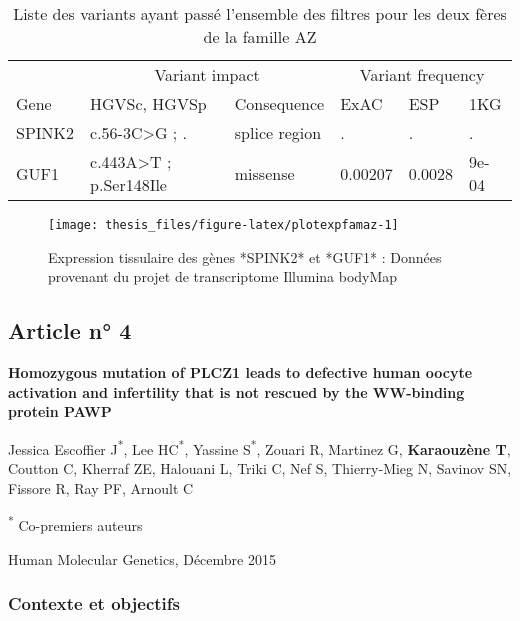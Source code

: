 \documentclass[12pt,twoside]{reedthesis}
\theoremstyle{definition}
\theoremstyle{definition}
\theoremstyle{remark}
\begin{document}
  \begin{longtable}[t]{llllll}
  \caption{\label{tab:tabrecapaz}Liste des variants ayant passé l'ensemble des filtres pour les deux fères de la famille AZ}\\
  \toprule
  \multicolumn{1}{c}{ } & \multicolumn{2}{c}{Variant impact} & \multicolumn{3}{c}{Variant frequency} \\
  \cmidrule(l{2pt}r{2pt}){2-3} \cmidrule(l{2pt}r{2pt}){4-6}
  Gene & HGVSc, HGVSp & Consequence & ExAC & ESP & 1KG\\
  \midrule
  SPINK2 & c.56-3C>G ; . & splice region & . & . & .\\
  GUF1 & c.443A>T ; p.Ser148Ile & missense & 0.00207 & 0.0028 & 9e-04\\
  \bottomrule
  \end{longtable}
  
  \newpage
  
  \begin{figure}
  
  {\centering \texttt{[image: thesis\_files/figure-latex/plotexpfamaz-1]} 
  
  }
  
  \caption[Expression tissulaire des gènes *SPINK2* et *GUF1*]{Expression tissulaire des gènes *SPINK2* et *GUF1* : Données provenant du projet de transcriptome Illumina bodyMap}\label{fig:plotexpfamaz}
  \end{figure}
  
  \newpage
  
  \subsection{Article n° 4}\label{article-n-4}
  
  \textbf{Homozygous mutation of PLCZ1 leads to defective human oocyte
  activation and infertility that is not rescued by the WW-binding protein
  PAWP}
  
  Jessica Escoffier J\textsuperscript{*}, Lee HC\textsuperscript{*},
  Yassine S\textsuperscript{*}, Zouari R, Martinez G, \textbf{Karaouzène
  T}, Coutton C, Kherraf ZE, Halouani L, Triki C, Nef S, Thierry-Mieg N,
  Savinov SN, Fissore R, Ray PF, Arnoult C
  
  \textsuperscript{*} Co-premiers auteurs
  
  Human Molecular Genetics, Décembre 2015
  
  \newpage
  
  \subsubsection{Contexte et objectifs}\label{contexte-et-objectifs-1}
  
\end{document}
